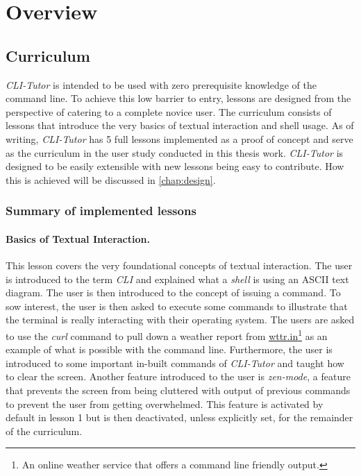 \section{Overview}
\subsection{Curriculum}

\textit{CLI-Tutor} is intended to be used with zero prerequisite knowledge of
the command line. To achieve this low barrier to entry, lessons are designed
from the perspective of catering to a complete novice user. The curriculum
consists of lessons that introduce the very basics of textual interaction and
shell usage. As of writing, \textit{CLI-Tutor} has 5 full lessons implemented
as a proof of concept and serve as the curriculum in the user study conducted
in this thesis work. \textit{CLI-Tutor} is designed to be easily extensible
with new lessons being easy to contribute. How this is achieved will be
discussed in \autoref{chap:design}.

\subsubsection{Summary of implemented lessons}

\paragraph{Basics of Textual Interaction.} This lesson covers the very
foundational concepts of textual interaction. The user is introduced to the
term \textit{CLI} and explained what a \textit{shell} is using an ASCII text
diagram. The user is then introduced to the concept of issuing a command. To
sow interest, the user is then asked to execute some commands to illustrate
that the terminal is really interacting with their operating system. The users
are asked to use the \textit{curl} command to pull down a weather report
from \url{wttr.in}\footnote{An online weather service that offers a command
line friendly output.} as an example of what is possible with the command line.
Furthermore, the user is introduced to some important in-built commands of
\textit{CLI-Tutor} and taught how to clear the screen. Another feature
introduced to the user is \textit{zen-mode}, a feature that prevents the screen
from being cluttered with output of previous commands to prevent the user from
getting overwhelmed. This feature is activated by default in lesson 1 but is
then deactivated, unless explicitly set, for the remainder of the curriculum.

